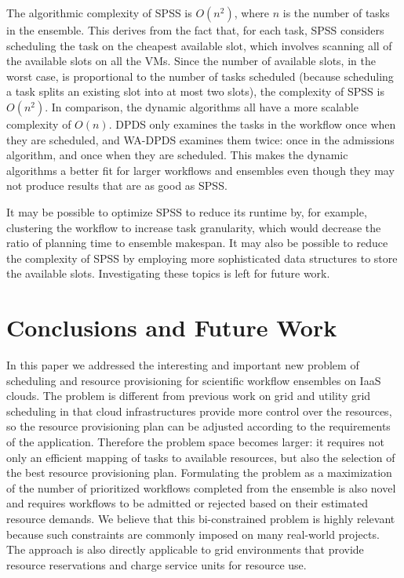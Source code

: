 \documentclass[conference]{IEEEtran}
\begin{document}
The algorithmic complexity of SPSS is $O(n^2)$, where $n$ is the number of tasks in the ensemble. This derives from the fact that, for each task, SPSS considers scheduling the task on the cheapest available slot, which involves scanning all of the available slots on all the VMs. Since the number of available slots, in the worst case, is proportional to the number of tasks scheduled (because scheduling a task splits an existing slot into at most two slots), the complexity of SPSS is $O(n^2)$. In comparison, the dynamic algorithms all have a more scalable complexity of $O(n)$. DPDS only examines the tasks in the workflow once when they are scheduled, and WA-DPDS examines them twice: once in the admissions algorithm, and once when they are scheduled. This makes the dynamic algorithms a better fit for larger workflows and ensembles even though they may not produce results that are as good as SPSS.

It may be possible to optimize SPSS to reduce its runtime by, for example, clustering the workflow to increase task granularity, which would decrease the ratio of planning time to ensemble makespan. It may also be possible to reduce the complexity of SPSS by employing more sophisticated data structures to store the available slots. Investigating these topics is left for future work.


\section{Conclusions and Future Work}
\label{sec:conclusions}

In this paper we addressed the interesting and important new problem of
scheduling and resource provisioning for scientific workflow ensembles
on IaaS clouds. The problem is different from previous work on grid and
utility grid scheduling in that cloud infrastructures provide more control
over the resources, so the resource provisioning plan can be adjusted
according to the requirements of the application. Therefore the problem
space becomes larger: it requires not only an efficient mapping of tasks
to available resources, but also the selection of the best resource
provisioning plan. Formulating the problem as a maximization of the
number of prioritized workflows completed from the ensemble is also novel and  
requires workflows to be admitted or rejected based on their estimated
resource demands. We believe that this bi-constrained problem is highly
relevant because such constraints are commonly imposed on many real-world
projects. The approach is also directly applicable to grid environments
that provide resource reservations and charge service units for resource use.
\end{document}
